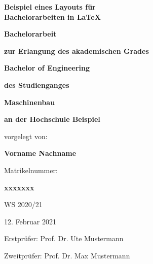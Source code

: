 \begin{titlepage}
	
\begin{center}

{\bfseries \LARGE Beispiel eines Layouts für \\
			Bachelorarbeiten in \LaTeX }

\vspace{1.5cm}
{\bfseries \Large Bachelorarbeit}

\vspace{1.5cm}
{\bfseries \large zur Erlangung des akademischen Grades}

\vspace{0.5cm}
{\bfseries \Large Bachelor of Engineering}

\vspace{0.5cm}
{\bfseries \large des Studienganges} 

\vspace{0.25cm}
{\bfseries \large Maschinenbau}

\vspace{0.25cm}
{\bfseries \large an der Hochschule Beispiel}

\vspace{1.5cm}
vorgelegt von:

\vspace{0.25cm}
{\bfseries \large Vorname Nachname}

\vspace{0.5cm}
Matrikelnummer:

\vspace{0.25cm}
{\bfseries \large xxxxxxx}

\vspace{1cm}
WS 2020/21

\vspace{0.25cm}
12. Februar 2021

\end{center}

\vspace{2.5cm}
Erstprüfer: Prof. Dr. Ute Mustermann

\vspace{0.25cm}
Zweitprüfer: Prof. Dr. Max Mustermann

\end{titlepage}